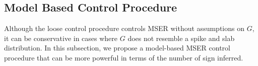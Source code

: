 \documentclass[11pt]{article}
\begin{document}

\subsection{Model Based Control Procedure}
Although the loose control procedure controls MSER without assumptions on $G$, it can be  conservative in cases where $G$ does not resemble a spike and slab distribution. In this subsection, we propose a model-based MSER control procedure that can be more powerful in terms of the number of sign inferred. 
\end{document}
